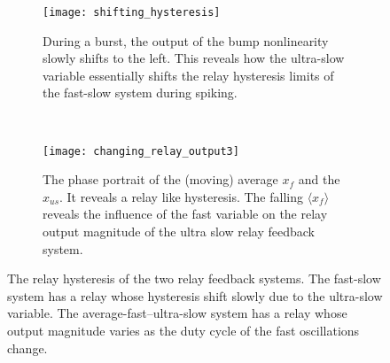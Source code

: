 \documentclass[a4paper, 12pt]{article}
\begin{document}
\begin{figure}[tbp]
    \centering
    \begin{subfigure}[t]{0.6\textwidth}
        \texttt{[image: shifting\_hysteresis]}
        \caption{During a burst, the output of the bump nonlinearity slowly shifts to the left. This reveals how the ultra-slow variable essentially shifts the relay hysteresis limits of the fast-slow system during spiking.}
        \label{fig:slow_relay}
    \end{subfigure}
    ~ %
    \begin{subfigure}[t]{0.7\textwidth}
        \texttt{[image: changing\_relay\_output3]}
        \caption{The phase portrait of the (moving) average $x_f$ and the $x_{us}$. It reveals a relay like hysteresis. The falling $\langle x_f \rangle$ reveals the influence of the fast variable on the relay output magnitude of the ultra slow relay feedback system.}
        \label{fig:ultra_slow_relay}
    \end{subfigure}
\caption{The relay hysteresis of the two relay feedback systems. The fast-slow system has a relay whose hysteresis shift slowly due to the ultra-slow variable. The average-fast--ultra-slow system has a relay whose output magnitude varies  as the duty cycle of the fast oscillations change.}
\label{fig:bursting_step3.2}
\end{figure}
\end{document}
